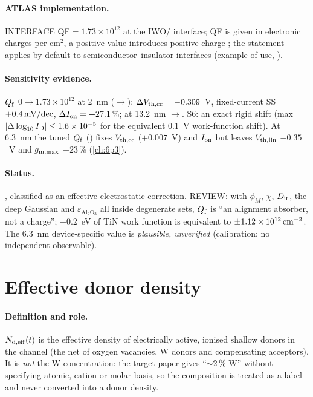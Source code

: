 \paragraph{ATLAS implementation.}
INTERFACE QF$=1.73\times10^{12}$ at the IWO/\AlO{} interface; QF is given in electronic charges per cm$^2$, a positive
value introduces positive charge \citep[p.~1260]{AtlasManual}; the statement applies by default to
semiconductor--insulator interfaces \citep[p.~1264]{AtlasManual} (example of use, \citealp[p.~1263]{AtlasManual}).

\paragraph{Sensitivity evidence.}
$Q_{\mathrm{f}}$ $0\rightarrow1.73\times10^{12}$ at 2~nm ($\rightarrow$): $\Delta V_{\mathrm{th,cc}} = -0.309$~V,
fixed-current SS $+0.4\,\mathrm{mV/dec}$, $\Delta I_{\mathrm{on}} = +27.1$\,\%; at 13.2~nm $\rightarrow$. S6: an exact
rigid shift (max $|\Delta\log_{10}I_{\mathrm{D}}| \le 1.6\times10^{-5}$ for the equivalent 0.1~V work-function shift). At 6.3~nm
the tuned $Q_{\mathrm{f}}$ () fixes $V_{\mathrm{th,cc}}$ ($+0.007$~V) and $I_{\mathrm{on}}$ but leaves $V_{\mathrm{th,lin}}$ $-0.35$~V and $g_{\mathrm{m,max}}$ $-23$\,\%
(\cref{ch:6p3}).

\paragraph{Status.}
, classified as an effective electrostatic correction. REVIEW: with $\phi_M$, $\chi$, $D_{\mathrm{it}}$, the deep
Gaussian and $\varepsilon_{\mathrm{Al_2O_3}}$ all inside degenerate sets, $Q_{\mathrm{f}}$ is ``an alignment absorber, not a
charge''; $\pm0.2$~eV of TiN work function is equivalent to $\pm1.12\times10^{12}\,\mathrm{cm}^{-2}$. The 6.3~nm device-specific
value is \emph{plausible, unverified} (calibration; no independent observable).

\section{Effective donor density}
\label{sec:par-nd}

\paragraph{Definition and role.}
$N_{\mathrm{d,eff}}(t)$ is the effective density of electrically active, ionised shallow donors in the channel (the net of
oxygen vacancies, W donors and compensating acceptors). It is \emph{not} the W concentration: the target paper
gives ``$\sim$2\,\% W'' without specifying atomic, cation or molar basis, so the composition is treated as a label and
never converted into a donor density.

